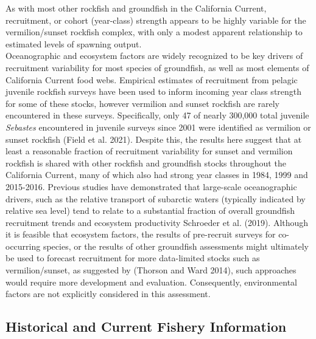 \documentclass[
  english,
  a4paper,
]{article}
\begin{document}
As with most other rockfish and groundfish in the California Current, recruitment,
or cohort (year-class) strength appears to be highly variable for the vermilion/sunset
rockfish complex, with only a modest apparent relationship to estimated levels of spawning output.\\
Oceanographic and ecosystem factors are widely recognized to be key drivers of
recruitment variability for most species of groundfish, as well as most elements
of California Current food webs. Empirical estimates of recruitment from pelagic
juvenile rockfish surveys have been used to inform incoming year class strength for
some of these stocks, however vermilion and sunset rockfish are rarely encountered
in these surveys. Specifically, only 47 of nearly 300,000 total juvenile \emph{Sebastes}
encountered in juvenile surveys since 2001 were identified as vermilion or sunset
rockfish (Field et al. 2021). Despite this, the results here suggest that at least a
reasonable fraction of recruitment variability for sunset and vermilion rockfish
is shared with other rockfish and groundfish stocks throughout the California Current,
many of which also had strong year classes in 1984, 1999 and 2015-2016. Previous studies
have demonstrated that large-scale oceanographic drivers, such as the relative transport
of subarctic waters (typically indicated by relative sea level) tend to relate to a
substantial fraction of overall groundfish recruitment trends and ecosystem
productivity Schroeder et al. (2019). Although it is feasible that
ecosystem factors, the results of pre-recruit surveys for co-occurring species,
or the results of other groundfish assessments might ultimately be used to
forecast recruitment for more data-limited stocks such as vermilion/sunset,
as suggested by (Thorson and Ward 2014), such approaches would require more
development and evaluation. Consequently, environmental factors are not
explicitly considered in this assessment.

\hypertarget{historical-and-current-fishery-information}{%
\subsection{Historical and Current Fishery Information}\label{historical-and-current-fishery-information}}
\end{document}
